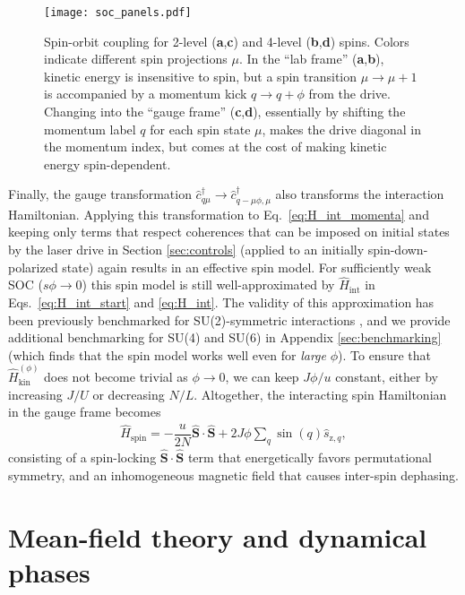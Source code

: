 \documentclass[aps,pra,nofootinbib,twocolumn,superscriptaddress]{revtex4-2}
\renewcommand{\t}{\text} %
\newcommand{\f}[2]{\dfrac{#1}{#2}} %
\newcommand{\p}[1]{\left(#1\right)} %
\renewcommand{\v}{\bm} %
\newcommand{\1}{\mathds{1}}
\renewcommand{\c}{\hat c}
\newcommand{\s}{\hat s}
\renewcommand{\H}{\hat H}
\renewcommand{\S}{\hat S}
\newcommand{\z}{\text{z}}
\newcommand{\spin}{\text{spin}}
\begin{document}
\begin{figure}
\centering
\texttt{[image: soc\_panels.pdf]}
\caption{
Spin-orbit coupling for 2-level ({\bf a},{\bf c}) and 4-level ({\bf b},{\bf d}) spins.
Colors indicate different spin projections $\mu$.
In the ``lab frame'' ({\bf a},{\bf b}), kinetic energy is insensitive to spin, but a spin transition $\mu\to\mu+1$ is accompanied by a momentum kick $q\to q+\phi$ from the drive.
Changing into the ``gauge frame'' ({\bf c},{\bf d}), essentially by shifting the momentum label $q$ for each spin state $\mu$, makes the drive diagonal in the momentum index, but comes at the cost of making kinetic energy spin-dependent.
}
\label{fig:soc_panels}
\end{figure}

Finally, the gauge transformation $\c_{q\mu}^\dag\to \c_{q-\mu\phi,\mu}^\dag$ also transforms the interaction Hamiltonian.
Applying this transformation to Eq.~\eqref{eq:H_int_momenta} and keeping only terms that respect coherences that can be imposed on initial states by the laser drive in Section \ref{sec:controls} (applied to an initially spin-down-polarized state) again results in an effective spin model.
For sufficiently weak SOC ($s\phi\to0$) this spin model is still well-approximated by $\H_{\t{int}}$ in Eqs.~\eqref{eq:H_int_start} and \eqref{eq:H_int}.
The validity of this approximation has been previously benchmarked for SU(2)-symmetric interactions \cite{he2019engineering, smale2019observation}, and we provide additional benchmarking for SU(4) and SU(6) in Appendix \ref{sec:benchmarking} (which finds that the spin model works well even for {\it large} $\phi$).
To ensure that $\H_{\t{kin}}^{(\phi)}$ does not become trivial as $\phi\to0$, we can keep $J\phi/u$ constant, either by increasing $J/U$ or decreasing $N/L$.
Altogether, the interacting spin Hamiltonian in the gauge frame becomes
\begin{align}
  \H_\spin = -\f{u}{2N} \v\S\cdot\v\S + 2J\phi \sum_q \sin\p{q} \s_{\z,q},
  \label{eq:H_spin}
\end{align}
consisting of a spin-locking $\v\S\cdot\v\S$ term that energetically favors permutational symmetry, and an inhomogeneous magnetic field that causes inter-spin dephasing.

\section{Mean-field theory and dynamical phases}
\label{sec:mean_field}
\end{document}
